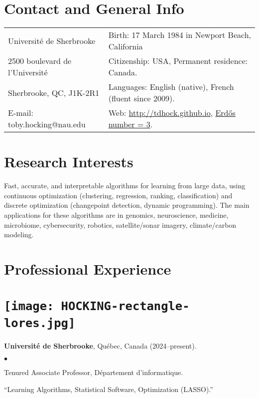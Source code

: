 \documentclass[margin,line]{res}
\newenvironment{list2}{
  \begin{list}{$\bullet$}{%
      \setlength{\itemsep}{0in}
      \setlength{\parsep}{0in} \setlength{\parskip}{0in}
      \setlength{\topsep}{0in} \setlength{\partopsep}{0in} 
      \setlength{\leftmargin}{0.2in}}}{\end{list}}
\begin{document}

\begin{resume}
\section{\sc Contact and General Info}
\vspace{.05in}
\begin{tabular*}{6.1in} {@{\extracolsep{\fill}}ll}
 Université de Sherbrooke & Birth: 17 March 1984 in Newport Beach, California\\
  2500 boulevard de l'Université  & Citizenship: USA, Permanent residence: Canada. \\
  Sherbrooke, QC, J1K-2R1 & Languages: English (native), French
                        (fluent since 2009). \\
  E-mail:  toby.hocking@nau.edu & Web: \url{http://tdhock.github.io}, \href{https://tdhock.github.io/blog/2022/erdos-number/}{Erd\H{o}s number = 3}. \\
\end{tabular*}

\section{\sc Research Interests}

Fast, accurate, and interpretable algorithms for learning from large
data, using continuous optimization (clustering, regression, ranking,
classification) and discrete optimization (changepoint detection,
dynamic programming). The main applications for these
algorithms are in genomics, neuroscience, medicine, microbiome,
cybersecurity, robotics, satellite/sonar imagery, climate/carbon
modeling.

\section{\sc Professional Experience \\ \hspace{0.1cm} \\ \texttt{[image: HOCKING-rectangle-lores.jpg]}}

{\bf Université de Sherbrooke}, Québec, Canada (2024--present).\\
\vspace*{-.1in}
\begin{list2}
\item[] Tenured Associate Professor, Département d'informatique.
\item[] ``Learning Algorithms, Statistical Software, Optimization (LASSO).''
\end{list2}


\end{resume}
\end{document}
